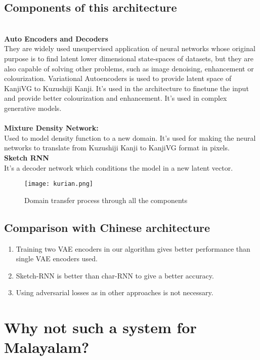 \documentclass[12pt]{report}
\begin{document}
\subsection{Components of this architecture}

\\
\textbf{Auto Encoders and Decoders}
\\
They are widely used unsupervised application of neural networks whose
original purpose is to find latent lower dimensional state-spaces of
datasets, but they are also capable of solving other problems, such as
image denoising, enhancement or colourization.
Variational Autoencoders is used to provide latent space of KanjiVG to
Kuzushiji Kanji. It’s used in the architecture to finetune the input
and provide better colourization and enhancement. It’s used in complex
generative models.
\\
\\
\textbf{Mixture Density Network:}
\\
Used to model density function to a new domain. It’s used for making
the neural networks to translate from Kuzushiji Kanji to KanjiVG
format in pixels.
\\
\textbf{Sketch RNN}
\\
It’s a decoder network which conditions the model in a new latent vector.

\begin{figure}[h]
\centering
\texttt{[image: kurian.png]}
\caption{Domain transfer process through all the components}
\end{figure}

\subsection{Comparison with Chinese architecture}
\begin{enumerate}
    \item Training two VAE encoders in our algorithm gives better
performance than single VAE encoders used.
    \item Sketch-RNN is better than char-RNN to give a better accuracy.
    \item Using adversarial losses as in other approaches is not necessary.
\end{enumerate}


\section {Why not such a system for Malayalam?}
\end{document}
